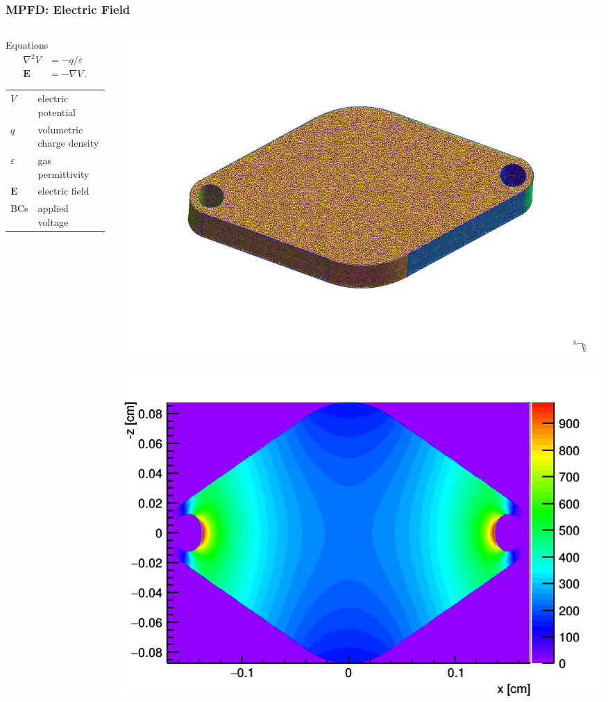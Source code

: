 \documentclass[fleqn]{beamer}
\begin{document}
\begin{frame}
 \frametitle{MPFD: Electric Field}
 \begin{columns}[c]
  \begin{column}{.5\textwidth}
  \begin{block}{Equations}
   \begin{equation*}
   \begin{split}
    \nabla^2 V &= -q / \varepsilon\\
    \boldsymbol{E} &= - \nabla V \, .
    \end{split}
   \end{equation*}
   \begin{tabular}{l|l}
    $V$ & electric potential\\
    $q$ & volumetric charge density\\
    $\varepsilon$ & gas permittivity\\
    $\boldsymbol{E}$ & electric field\\
    BCs & applied voltage
   \end{tabular}
   \end{block}
  \end{column}
  
  \begin{column}{.5\textwidth}
   \includegraphics[width = \textwidth, trim = {1cm, 7cm, 1cm, 7cm}, clip]{geometry}
   

   \includegraphics[width = \textwidth]{c1}
   

\end{column}
\end{columns}
\end{frame}
\end{document}
